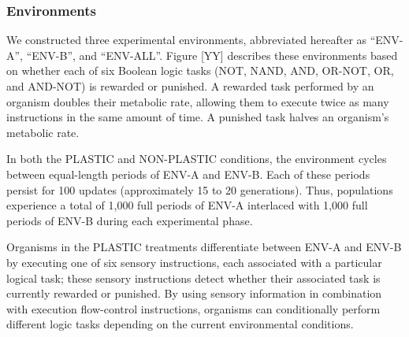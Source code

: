 \subsubsection{Environments}
\label{sec:methods:experiment:environments}


We constructed three experimental environments, abbreviated hereafter as ``ENV-A'', ``ENV-B'', and ``ENV-ALL''.
Figure [YY] describes these environments based on whether each of six Boolean logic tasks (NOT, NAND, AND, OR-NOT, OR, and AND-NOT) is rewarded or punished.
A rewarded task performed by an organism doubles their metabolic rate, allowing them to execute twice as many instructions in the same amount of time.
A punished task halves an organism's metabolic rate. 




In both the PLASTIC and NON-PLASTIC conditions, the environment cycles between equal-length periods of ENV-A and ENV-B.
Each of these periods persist for 100 updates (approximately 15 to 20 generations).
Thus, populations experience a total of 1,000 full periods of ENV-A interlaced with 1,000 full periods of ENV-B during each experimental phase.

Organisms in the PLASTIC treatments differentiate between ENV-A and ENV-B by executing one of six sensory instructions, each associated with a particular logical task; these sensory instructions detect whether their associated task is currently rewarded or punished.
By using sensory information in combination with execution flow-control instructions, organisms can conditionally perform different logic tasks depending on the current environmental conditions.

